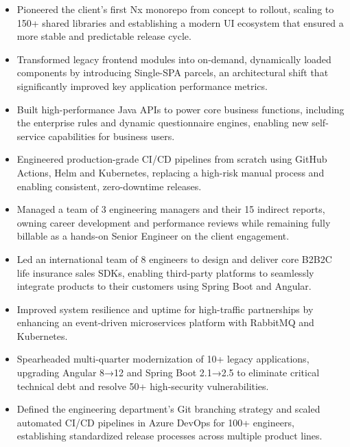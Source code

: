 \begin{itemize}[leftmargin=*]
    \item
    Pioneered the client's first Nx monorepo from concept to rollout, scaling to 150+ shared libraries and establishing
    a modern UI ecosystem that ensured a more stable and predictable release cycle.
    \item
    Transformed legacy frontend modules into on-demand, dynamically loaded components by introducing Single-SPA parcels,
    an architectural shift that significantly improved key application performance metrics.
    \item Built high-performance Java APIs to power core business functions, including the enterprise rules and dynamic
    questionnaire engines, enabling new self-service capabilities for business users.
    \item
    Engineered production-grade CI/CD pipelines from scratch using GitHub Actions, Helm and Kubernetes, replacing a
    high-risk manual process and enabling consistent, zero-downtime releases.
    \item
    Managed a team of 3 engineering managers and their 15 indirect reports, owning career development and performance
    reviews while remaining fully billable as a hands-on Senior Engineer on the client engagement.
\end{itemize}
\vspace{\jobGroupBottomMargin}

\begin{itemize}[leftmargin=*]
    \item Led an international team of 8 engineers to design and deliver core B2B2C life insurance sales SDKs, enabling
    third-party platforms to seamlessly integrate products to their customers using Spring Boot and Angular.
    \item Improved system resilience and uptime for high-traffic partnerships by enhancing an event-driven microservices
    platform with RabbitMQ and Kubernetes.
    \item
    Spearheaded multi-quarter modernization of 10+ legacy applications, upgrading Angular 8→12 and Spring Boot 2.1→2.5
    to eliminate critical technical debt and resolve 50+ high-security vulnerabilities.
    \item
    Defined the engineering department's Git branching strategy and scaled automated CI/CD pipelines in Azure DevOps for
    100+ engineers, establishing standardized release processes across multiple product lines.
\end{itemize}
\vspace{\jobGroupBottomMargin}

